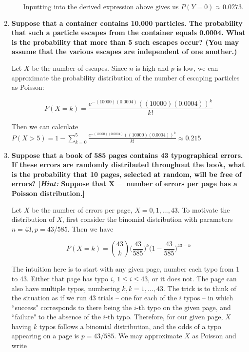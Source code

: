 \documentclass[10pt, oneside]{article}   	%
\theoremstyle{definition}
\begin{document}
\begin{enumerate}[label=8.\arabic*]
\begin{enumerate}
	Inputting into the derived expression above gives us $\boxed{P(Y = 0) \approx 0.0273}$.
	\end{enumerate}

\newpage
\item  \begin{tcolorbox}[
  colback=Cerulean!5!white,
  colframe=Cerulean!75!black]
\textbf{Suppose that a container contains 10,000 particles. The probability that such a particle escapes from the container equals 0.0004. What is the probability that more than 5 such escapes occur? (You may assume that the various escapes are independent of one another.)}
\end{tcolorbox}

Let $X$ be the number of escapes. Since $n$ is high and $p$ is low, we can approximate the probability distribution of the number of escaping particles as Poisson:

\[ P(X = k) = \frac{e^{-(10000)(0.0004)} ((10000)(0.0004))^k}{k!} \]

Then we can calculate $P(X > 5) = 1 - \sum^5_{k=0} \frac{e^{-(10000)(0.0004)} ((10000)(0.0004))^k}{k!} \approx \boxed{0.215} $

\item  \begin{tcolorbox}[
  colback=Cerulean!5!white,
  colframe=Cerulean!75!black]
\textbf{Suppose that a book of 585 pages contains 43 typographical errors. If these errors are randomly distributed throughout the book, what is the probability that 10 pages, selected at random, will be free of errors? [\textit{Hint:} Suppose that $\bm{X =}$ number of errors per page has a Poisson distribution.]}
\end{tcolorbox}

Let $X$ be the number of errors per page, $X = 0, 1, ..., 43$. To motivate the distribution of $X$, first consider the binomial distribution with parameters $n = 43, p = 43/585$. Then we have

\[ P(X = k) = \binom{43}{k} \Bigg( \frac{43}{585} \Bigg)^k \Bigg( 1 - \frac{43}{585} \Bigg)^{43-k} \]

The intuition here is to start with any given page, number each typo from 1 to 43. Either that page has typo $i$, $1 \leq i \leq 43$, or it does not. The page can also have multiple typos, numbering $k, k = 1, ..., 43$. The trick is to think of the situation as if we run 43 trials -- one for each of the $i$ typos -- in which ``success" corresponds to there being the $i$-th typo on the given page, and ``failure" to the absence of the $i$-th typo. Therefore, for our given page, $X$ having $k$ typos follows a binomial distribution, and the odds of a typo appearing on a page is $p = 43/585$. We may approximate $X$ as Poisson and write


\end{enumerate}
\end{document}
